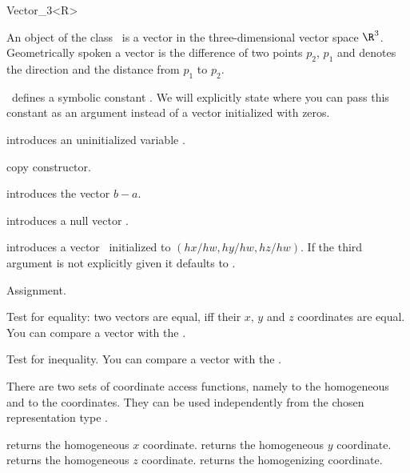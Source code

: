 \begin{ccRefClass} {Vector_3<R>}

\ccDefinition

An object of the class \ccRefName\ is a vector in the three-dimensional 
vector space $\R^3$. Geometrically spoken a vector is the difference
of two points $p_2$, $p_1$ and denotes the direction and the distance
from   $p_1$ to $p_2$. 

\cgal\ defines a symbolic constant . We 
will explicitly state where you can pass this constant as an argument
instead of a vector initialized with zeros.


\ccCreation
{}


\ccHidden{}
             {introduces an uninitialized variable \ccVar.}

\ccHidden {}
 	    {copy constructor.}

 	    {introduces the vector $b-a$.}

 	    {introduces a null vector \ccVar.}

            {introduces a vector \ccVar\ initialized to $(hx/hw, hy/hw, hz/hw)$.
             If the third argument is not explicitly given it defaults
             to .}


\ccOperations

\ccHidden {}
        {Assignment.}

       {Test for equality: two vectors are equal, iff their $x$, $y$ 
        and $z$ coordinates are equal. You can compare a vector with the
        .}

       {Test for inequality. You can compare a vector with the
        .}


There are two sets of coordinate access functions, namely to the
homogeneous and to the  coordinates. They can be used
independently from the chosen representation type .

       {returns the homogeneous $x$ coordinate.}
\ccGlue
{}
       {returns the homogeneous $y$ coordinate.}
\ccGlue
{}
       {returns the homogeneous $z$ coordinate.}
\ccGlue
{}
       {returns the homogenizing  coordinate.}


\end{ccRefClass}
